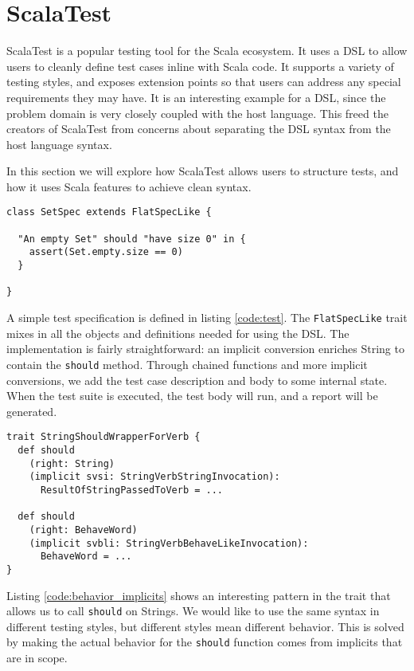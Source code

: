 \section{ScalaTest}

ScalaTest is a popular testing tool for the Scala ecosystem.
It uses a DSL to allow users to cleanly define test cases inline with Scala code.
It supports a variety of testing styles, and exposes extension points so that users can address any special requirements they may have.
It is an interesting example for a DSL, since the problem domain is very closely coupled with the host language.
This freed the creators of ScalaTest from concerns about separating the DSL syntax from the host language syntax.

In this section we will explore how ScalaTest allows users to structure tests, and how it uses Scala features to achieve clean syntax.

\begin{lstlisting}[caption=Simple test, label=code:test]
class SetSpec extends FlatSpecLike {

  "An empty Set" should "have size 0" in {
    assert(Set.empty.size == 0)
  }
	
}
\end{lstlisting}

A simple test specification is defined in listing \ref{code:test}.
The \texttt{FlatSpecLike} trait mixes in all the objects and definitions needed for using the DSL.
The implementation is fairly straightforward: an implicit conversion enriches String to contain the \texttt{should} method.
Through chained functions and more implicit conversions, we add the test case description and body to some internal state.
When the test suite is executed, the test body will run, and a report will be generated.

\begin{lstlisting}[caption=Behavior from implicits, label=code:behavior_implicits, float]
trait StringShouldWrapperForVerb {
  def should
    (right: String)
    (implicit svsi: StringVerbStringInvocation):
      ResultOfStringPassedToVerb = ...
      
  def should
    (right: BehaveWord)
    (implicit svbli: StringVerbBehaveLikeInvocation):
      BehaveWord = ...
}
\end{lstlisting}

Listing \ref{code:behavior_implicits} shows an interesting pattern in the trait that allows us to call \texttt{should} on Strings.
We would like to use the same syntax in different testing styles, but different styles mean different behavior.
This is solved by making the actual behavior for the \texttt{should} function comes from implicits that are in scope.

